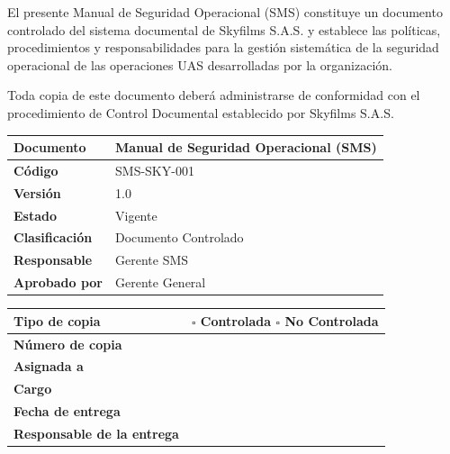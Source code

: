 

El presente Manual de Seguridad Operacional (SMS) constituye un documento controlado del sistema documental de Skyfilms S.A.S. y establece las políticas, procedimientos y responsabilidades para la gestión sistemática de la seguridad operacional de las operaciones UAS desarrolladas por la organización.

Toda copia de este documento deberá administrarse de conformidad con el procedimiento de Control Documental establecido por Skyfilms S.A.S.

\vspace{0.2cm}

\renewcommand{\arraystretch}{1.15}

\begin{table}[H]
\centering
\begin{tabularx}{\textwidth}{|L{5cm}|X|}
\hline
\textbf{Documento} & Manual de Seguridad Operacional (SMS) \\ \hline
\textbf{Código} & SMS-SKY-001 \\ \hline
\textbf{Versión} & 1.0 \\ \hline
\textbf{Estado} & Vigente \\ \hline
\textbf{Clasificación} & Documento Controlado \\ \hline
\textbf{Responsable} & Gerente SMS \\ \hline
\textbf{Aprobado por} & Gerente General \\ \hline
\end{tabularx}
\end{table}

\vspace{0.2cm}

\renewcommand{\arraystretch}{1.15}

\begin{table}[H]
\centering
\begin{tabularx}{\textwidth}{|L{5cm}|X|}
\hline
\textbf{Tipo de copia} &
$\square$ Controlada \hspace{1cm}
$\square$ No Controlada \\ \hline

\textbf{Número de copia} & \\ \hline

\textbf{Asignada a} & \\ \hline

\textbf{Cargo} & \\ \hline

\textbf{Fecha de entrega} & \\ \hline

\textbf{Responsable de la entrega} & \\ \hline

\end{tabularx}
\end{table}

